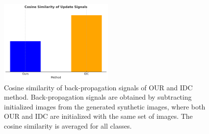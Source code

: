 \documentclass{article}
\theoremstyle{plain}
\theoremstyle{definition}
\theoremstyle{remark}
\begin{document}
\begin{figure}[t]
    \centering
    \includegraphics[width=0.5\textwidth]{./images/loss_cosine.png}
    \caption{Cosine similarity of back-propagation signals of OUR and IDC method. Back-propagation signals are obtained by subtracting initialized images from the generated synthetic images, where both OUR and IDC are initialized with the same set of images. The cosine similarity is averaged for all classes.}
    \label{fig:training_signal}
\end{figure}
\end{document}
